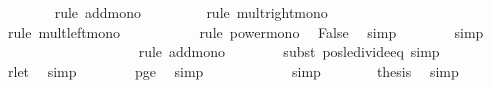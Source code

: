 \begin{isabellebody}
\ \ \ \ \ \ \isamarkupfalse%
\ {\isacharparenleft}{\kern0pt}rule\ add{\isacharunderscore}{\kern0pt}mono{\isacharparenright}{\kern0pt}\isanewline
\ \ \ \ \ \ \ \isamarkupfalse%
\ {\isacharparenleft}{\kern0pt}rule\ mult{\isacharunderscore}{\kern0pt}right{\isacharunderscore}{\kern0pt}mono{\isacharparenright}{\kern0pt}\isanewline
\ \ \ \ \ \ \ \ \isamarkupfalse%
\ {\isacharparenleft}{\kern0pt}rule\ mult{\isacharunderscore}{\kern0pt}left{\isacharunderscore}{\kern0pt}mono{\isacharparenright}{\kern0pt}\isanewline
\ \ \ \ \ \ \ \ \ \isamarkupfalse%
\ {\isacharparenleft}{\kern0pt}rule\ power{\isacharunderscore}{\kern0pt}mono{\isacharparenright}{\kern0pt}\ \isamarkupfalse%
\ False\ \isamarkupfalse%
\ simp\isanewline
\ \ \ \ \ \ \isamarkupfalse%
\ simp{\isacharplus}{\kern0pt}\isanewline
\ \ \ \ \isamarkupfalse%
\ \isamarkupfalse%
\ {\isachardoublequoteopen}{\isachardot}{\kern0pt}{\isachardot}{\kern0pt}{\isachardot}{\kern0pt}\ {\isasymle}\ {}{\isacharslash}{\kern0pt}{}\ {\isacharplus}{\kern0pt}\ {}{\isacharslash}{\kern0pt}{}{\isachardoublequoteclose}\isanewline
\ \ \ \ \ \ \isamarkupfalse%
\ {\isacharparenleft}{\kern0pt}rule\ add{\isacharunderscore}{\kern0pt}mono{\isacharparenright}{\kern0pt}\isanewline
\ \ \ \ \ \ \isamarkupfalse%
\ {\isacharparenleft}{\kern0pt}subst\ pos{\isacharunderscore}{\kern0pt}le{\isacharunderscore}{\kern0pt}divide{\isacharunderscore}{\kern0pt}eq{\isacharcomma}{\kern0pt}\ simp{\isacharparenright}{\kern0pt}\isanewline
\ \ \ \ \ \ \isamarkupfalse%
\ r{\isacharunderscore}{\kern0pt}le{\isacharunderscore}{\kern0pt}t{}\ \isamarkupfalse%
\ simp\isanewline
\ \ \ \ \ \ \isamarkupfalse%
\ p{\isacharunderscore}{\kern0pt}ge{\isacharunderscore}{\kern0pt}{}{}\ \isamarkupfalse%
\ simp\isanewline
\ \ \ \ \isamarkupfalse%
\ \isamarkupfalse%
\ {\isachardoublequoteopen}{\isachardot}{\kern0pt}{\isachardot}{\kern0pt}{\isachardot}{\kern0pt}\ {\isasymle}\ {}{\isacharslash}{\kern0pt}{}{\isachardoublequoteclose}\ \isamarkupfalse%
\ simp\isanewline
\ \ \ \ \isamarkupfalse%
\ \isamarkupfalse%
\ {\isacharquery}{\kern0pt}thesis\ \isamarkupfalse%
\ simp\isanewline
\ \ \isamarkupfalse%
\isanewline

\end{isabellebody}
